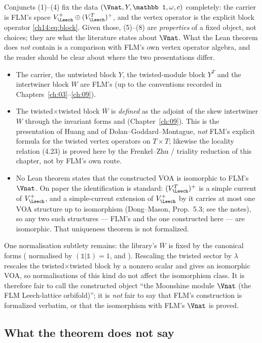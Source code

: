 Conjuncts (1)--(4) fix the data $(\Vnat,Y,\mathbb 1,\omega,c)$ completely: the carrier is FLM's space
$V_\Leech^+\oplus(V_\Leech^T)^+$, and the vertex operator is the explicit block operator
\eqref{ch14:eq:block}.  Given those, (5)--(8) are \emph{properties} of a fixed object, not choices; they are
what the literature states about $\Vnat$.  What the Lean theorem does \emph{not} contain is a comparison
with FLM's own vertex operator algebra, and the reader should be clear about where the two presentations
differ.
\begin{itemize}
\item The carrier, the untwisted block $Y$, the twisted-module block $Y^T$ and the intertwiner block $W$
  are FLM's (up to the conventions recorded in Chapters~\ref{ch:03}--\ref{ch:09}).
\item The twisted$\times$twisted block $\overline W$ is \emph{defined} as the adjoint of the skew intertwiner
  $W$ through the invariant forms  and  (Chapter~\ref{ch:09}).  This is the
  presentation of Huang and of Dolan--Goddard--Montague, \emph{not} FLM's explicit formula for the twisted
  vertex operators on $T\times T$; likewise the locality relation (4.23) is proved here by the
  Frenkel--Zhu / triality reduction of this chapter, not by FLM's own route.
\item No Lean theorem states that the constructed VOA is isomorphic to FLM's $\Vnat$.  On paper the
  identification is standard: $(V_\Leech^T)^+$ is a simple current of $V_\Leech^+$, and a simple-current
  extension of $V_\Leech^+$ by it carries at most one VOA structure up to isomorphism (Dong--Mason, Prop.~5.3; see the
  notes), so any two such structures — FLM's and the one constructed here — are isomorphic.  That
  uniqueness theorem is not formalized.
\end{itemize}
One normalisation subtlety remains: the library's $\overline W$ is fixed by the canonical forms
( normalised by $(\mathbb 1|\mathbb 1)=1$, and ).  Rescaling the twisted sector by
$\lambda$ rescales the twisted$\times$twisted block by a nonzero scalar and gives an isomorphic VOA, so
normalisations of this kind do not affect the isomorphism class.  It is therefore fair to call the
constructed object ``the Moonshine module $\Vnat$ (the FLM Leech-lattice orbifold)''; it is \emph{not} fair
to say that FLM's construction is formalized verbatim, or that the isomorphism with FLM's $\Vnat$ is proved.

\subsection{What the theorem does not say}

